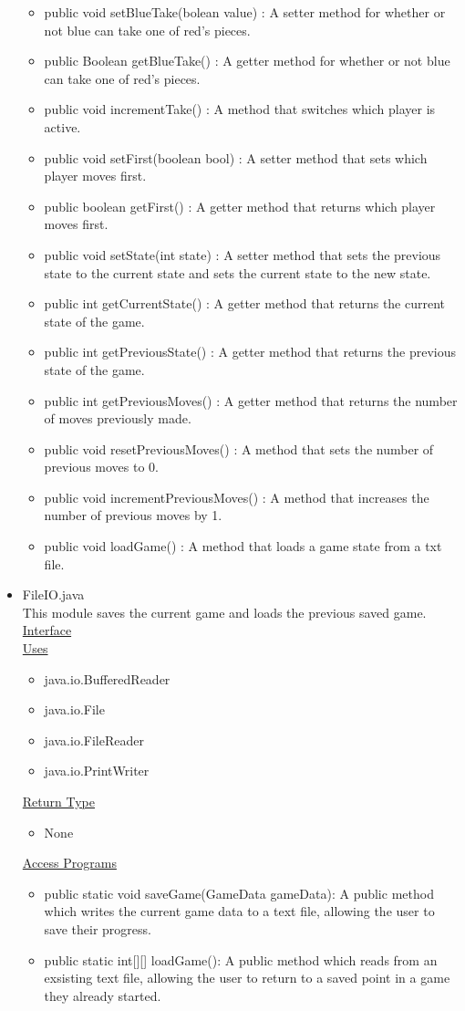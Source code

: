 \documentclass[12pt]{article}
\begin{document}
\begin{itemize}
\begin{itemize}
					\item public void setBlueTake(bolean value) : A setter method for whether or not blue can take one of red’s pieces.
					\item public Boolean getBlueTake() : A getter method for whether or not blue can take one of red’s pieces.
					\item public void incrementTake() : A method that switches which player is active.
					\item public void setFirst(boolean bool) : A setter method that sets which player moves first.
					\item public boolean getFirst() : A getter method that returns which player moves first.
					\item public void setState(int state) : A setter method that sets the previous state to the current state and sets the current state to the new state.
					\item public int getCurrentState() : A getter method that returns the current state of the game.
					\item public int getPreviousState() : A getter method that returns the previous state of the game.
					\item public int getPreviousMoves() : A getter method that returns the number of moves previously made.
					\item public void resetPreviousMoves() : A method that sets the number of previous moves to 0.
					\item public void incrementPreviousMoves() : A method that increases the number of previous moves by 1.
					\item public void loadGame() : A method that loads a game state from a txt file.
				\end{itemize}
\item FileIO.java \\
This module saves the current game and loads the previous saved game. \\
\underline{Interface} \\
\underline{Uses}
\begin{itemize}
	\item java.io.BufferedReader
	\item java.io.File
	\item java.io.FileReader
	\item java.io.PrintWriter
\end{itemize}
\underline{Return Type}
\begin{itemize}
	\item None
\end{itemize}
\underline{Access Programs}
\begin{itemize}
	\item public static void saveGame(GameData gameData): A public method which writes the current game data to a text file, allowing the user to save their progress.
	\item public static int[][] loadGame(): A public method which reads from an exsisting text file, allowing the user to return to a saved point in a game they already started.
\end{itemize}



\end{itemize}
\end{document}
